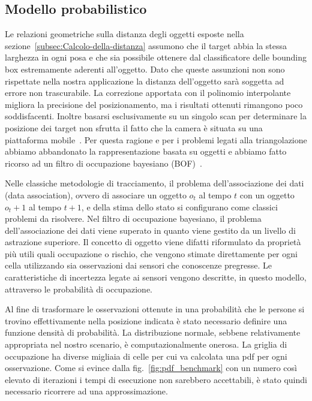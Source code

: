\documentclass[a4paper]{article}
\begin{document}
	
	\subsection{Modello probabilistico}\label{subsec:Modello-probabilistico}
	Le relazioni geometriche sulla distanza degli oggetti esposte nella
	sezione~\ref{subsec:Calcolo-della-distanza} assumono che il target abbia la
	stessa larghezza in ogni posa e che sia possibile ottenere dal
	classificatore delle bounding box estremamente aderenti all'oggetto. Dato
	che queste assunzioni non sono rispettate nella nostra applicazione la
	distanza dell'oggetto sarà soggetta ad errore non trascurabile. La
	correzione apportata con il polinomio interpolante migliora la precisione
	del posizionamento, ma i risultati ottenuti rimangono poco soddisfacenti.
	Inoltre basarsi esclusivamente su un singolo scan per determinare la
	posizione dei target non sfrutta il fatto che la camera è situata su una
	piattaforma mobile~\cite{sunderhauf2018}. Per questa ragione e per i
	problemi legati alla triangolazione abbiamo abbandonato la rappresentazione
	basata su oggetti e abbiamo fatto ricorso ad un filtro di occupazione
	bayesiano (BOF)~\cite{tay2008bayesian}.

	Nelle classiche metodologie di tracciamento, il problema dell'associazione
	dei dati (data association), ovvero di associare un oggetto $o_t$ al tempo
	$t$ con un oggetto $o_t+1$ al tempo $t+1$, e della stima dello stato si
	configurano come classici problemi da risolvere. Nel filtro di occupazione
	bayesiano, il problema dell'associazione dei dati viene superato in quanto
	viene gestito da un livello di astrazione superiore. Il concetto di oggetto
	viene difatti riformulato da proprietà più utili quali occupazione o
	rischio, che vengono stimate direttamente per ogni cella utilizzando sia
	osservazioni dai sensori che conoscenze pregresse. Le caratteristiche di
	incertezza legate ai sensori vengono descritte, in questo modello,
	attraverso le probabilità di occupazione.

	Al fine di trasformare le osservazioni ottenute in una probabilità che le
	persone si trovino effettivamente nella posizione indicata è stato
	necessario definire una funzione densità di probabilità. La distribuzione
	normale, sebbene relativamente appropriata nel nostro scenario, è
	computazionalmente onerosa. La griglia di occupazione ha diverse migliaia
	di celle per cui va calcolata una pdf per ogni osservazione. Come si evince
	dalla fig.~\ref{fig:pdf_benchmark} con un numero così elevato di iterazioni
	i tempi di esecuzione non sarebbero accettabili, è stato quindi necessario
	ricorrere ad una approssimazione.
	
\end{document}

